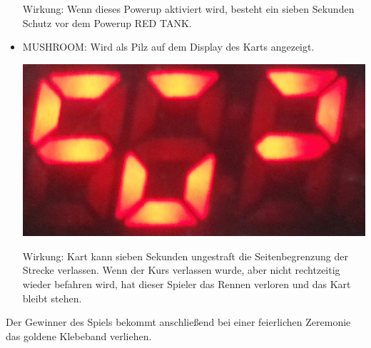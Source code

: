 \begin{itemize}
	Wirkung: Wenn dieses Powerup aktiviert wird, besteht ein sieben Sekunden Schutz vor  
	dem Powerup RED TANK. 
	\item MUSHROOM: Wird als Pilz auf dem Display des Karts angezeigt. 
	
	\begin{center}
		\includegraphics[scale=0.2]{Bilder/MUSHROOM}
	\end{center}
	
	Wirkung: Kart kann sieben Sekunden ungestraft die Seitenbegrenzung der Strecke verlassen. 		
	Wenn der Kurs verlassen wurde, aber nicht rechtzeitig wieder befahren wird, hat dieser 	
	Spieler das Rennen verloren und das Kart bleibt stehen.
\end{itemize}

Der Gewinner des Spiels bekommt anschließend bei einer feierlichen Zeremonie das goldene Klebeband verliehen. 


 




































